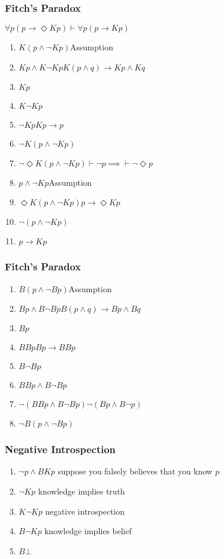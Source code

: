\documentclass[UTF8,11pt,colorlinks,compress,openany]{beamer}%
\begin{document}
\begin{frame}\frametitle{Fitch's Paradox}\centering{}
	\begin{block}{$\forall p(p\to\Diamond Kp)\vdash\forall p(p\to Kp)$}
		\begin{enumerate}
			\item $K(p\wedge\neg Kp)$\hfill Assumption
			\item $Kp\wedge K\neg Kp$\hfill $K(p\wedge q)\to Kp\wedge Kq$
			\item $Kp$
			\item $K\neg Kp$
			\item $\neg Kp$\hfill $Kp\to p$
			\item $\neg K(p\wedge\neg Kp)$
			\item $\neg\Diamond K(p\wedge\neg Kp)$\hfill $\vdash\neg p\implies\vdash\neg\Diamond p$
			\item $p\wedge\neg Kp$\hfill Assumption
			\item $\Diamond K(p\wedge\neg Kp)$\hfill $p\to\Diamond Kp$
			\item $\neg(p\wedge\neg Kp)$
			\item $p\to Kp$
		\end{enumerate}
	\end{block}
\end{frame}

\begin{frame}\frametitle{Fitch's Paradox}
	\begin{block}{}
		\begin{enumerate}
			\item $B(p\wedge\neg Bp)$\hfill Assumption
			\item $Bp\wedge B\neg Bp$\hfill $B(p\wedge q)\to Bp\wedge Bq$
			\item $Bp$
			\item $BBp$\hfill $Bp\to BBp$
			\item $B\neg Bp$
			\item $BBp\wedge B\neg Bp$
			\item $\neg(BBp\wedge B\neg Bp)$\hfill $\neg(Bp\wedge B\neg p)$
			\item $\neg B(p\wedge\neg Bp)$
		\end{enumerate}
	\end{block}
\end{frame}

\begin{frame}\frametitle{Negative Introspection}
\begin{enumerate}
	\item $\neg p\wedge BKp$ \hfill suppose you falsely believes that you know $p$
	\item $\neg Kp$ \hfill knowledge implies truth
	\item $K\neg Kp$ \hfill negative introspection
	\item $B\neg Kp$ \hfill knowledge implies belief
	\item $B\bot$
\end{enumerate}
\end{frame}
\end{document}
